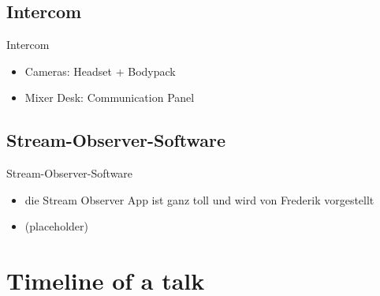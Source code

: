 \documentclass[hyperref={pdfpagelabels=false},aspectratio=169]{beamer}
\begin{document}
\subsection{Intercom} %
 	\begin{frame}{Intercom}
 	\begin{itemize}
 		\item Cameras: Headset + Bodypack
 		\item Mixer Desk: Communication Panel
 	\end{itemize}
 	\end{frame}

\subsection{Stream-Observer-Software} %
\begin{frame}{Stream-Observer-Software}
\begin{itemize}
\item die Stream Observer App  ist ganz toll und wird von Frederik vorgestellt
\item  (placeholder)
\end{itemize}
\end{frame}

\section{Timeline of a talk}  %
\end{document}
